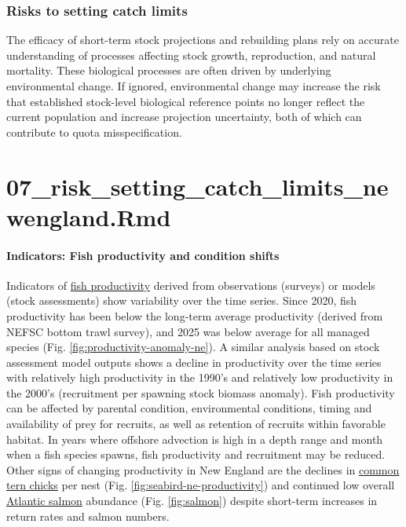 \documentclass[
  10pt,
]{article}
\begin{document}
\subsubsection{Risks to setting catch limits}\label{risks-to-setting-catch-limits}

The efficacy of short-term stock projections and rebuilding plans rely on accurate understanding of processes affecting stock growth, reproduction, and natural mortality. These biological processes are often driven by underlying environmental change. If ignored, environmental change may increase the risk that established stock-level biological reference points no longer reflect the current population and increase projection uncertainty, both of which can contribute to quota misspecification.

\section{07\_risk\_setting\_catch\_limits\_newengland.Rmd}\label{risk_setting_catch_limits_newengland.rmd}

\paragraph{Indicators: Fish productivity and condition shifts}\label{indicators-fish-productivity-and-condition-shifts}

Indicators of \href{https://noaa-edab.github.io/catalog/productivity_anomaly.html}{fish productivity} derived from observations (surveys) or models (stock assessments) show variability over the time series. Since 2020, fish productivity has been below the long-term average productivity (derived from NEFSC bottom trawl survey), and 2025 was below average for all managed species (Fig. \ref{fig:productivity-anomaly-ne}). A similar analysis based on stock assessment model outputs shows a decline in productivity over the time series with relatively high productivity in the 1990's and relatively low productivity in the 2000's (recruitment per spawning stock biomass anomaly). Fish productivity can be affected by parental condition, environmental conditions, timing and availability of prey for recruits, as well as retention of recruits within favorable habitat. In years where offshore advection is high in a depth range and month when a fish species spawns, fish productivity and recruitment may be reduced. Other signs of changing productivity in New England are the declines in \href{https://noaa-edab.github.io/catalog/seabird_ne.html}{common tern chicks} per nest (Fig. \ref{fig:seabird-ne-productivity}) and continued low overall \href{https://noaa-edab.github.io/catalog/gom_salmon.html}{Atlantic salmon} abundance (Fig. \ref{fig:salmon}) despite short-term increases in return rates and salmon numbers.
\end{document}
